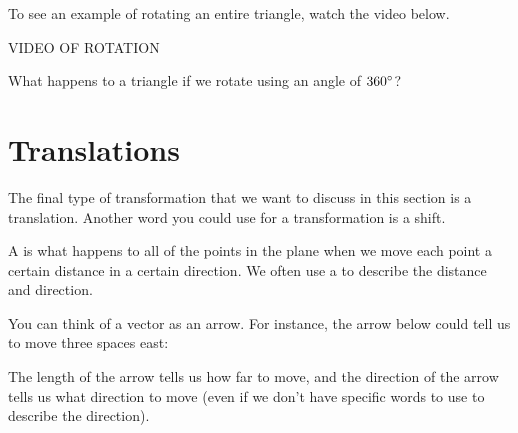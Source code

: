 \documentclass{ximera}
\begin{document}
To see an example of rotating an entire triangle, watch the video below.

VIDEO OF ROTATION

\begin{question}
What happens to a triangle if we rotate using an angle of $360\degree$?
\begin{multipleChoice}
\end{multipleChoice}
\end{question}


\section{Translations}
The final type of transformation that we want to discuss in this section is a translation. Another word you could use for a transformation is a shift.
\begin{definition}
A  is what happens to all of the points in the plane when we move each point a certain distance in a certain direction. We often use a  to describe the distance and direction.
\end{definition}
You can think of a vector as an arrow. For instance, the arrow below could tell us to move three spaces east:
\begin{center}
\end{center}
The length of the arrow tells us how far to move, and the direction of the arrow tells us what direction to move (even if we don't have specific words to use to describe the direction). 
\end{document}
